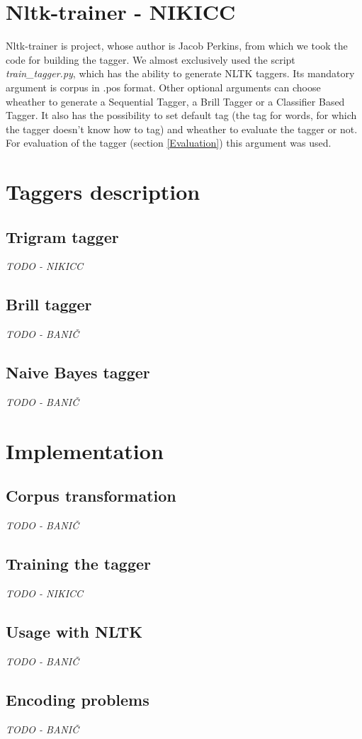 \documentclass[11pt,a4paper,english,twocolumn]{article}
\begin{document}
\section{Nltk-trainer - NIKICC}
Nltk-trainer\cite{nltk-trainer} is project, whose author is Jacob Perkins, from which we took the code for building the tagger. We almost exclusively used the script \textit{train\_tagger.py}, which has the ability to generate NLTK taggers. Its mandatory argument is corpus in .pos format. Other optional arguments can choose wheather to generate a Sequential Tagger, a Brill Tagger or a Classifier Based Tagger. It also has the possibility to set default tag (the tag for words, for which the tagger doesn't know how to tag) and wheather to evaluate the tagger or not. For evaluation of the tagger (section \ref{Evaluation}) this argument was used. 
\section{Taggers description}
\subsection{Trigram tagger}
\textit{TODO - NIKICC}
\subsection{Brill tagger}
\textit{TODO - BANIČ}
\subsection{Naive Bayes tagger}
\textit{TODO - BANIČ}
\section{Implementation}
\subsection{Corpus transformation}\label{Corpus transformation}
\textit{TODO - BANIČ}
\subsection{Training the tagger}
\textit{TODO - NIKICC}
\subsection{Usage with NLTK}
\textit{TODO - BANIČ}
\subsection{Encoding problems}
\textit{TODO - BANIČ}
\end{document}

